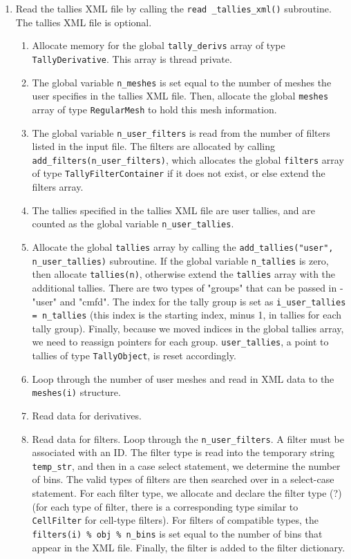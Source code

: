 \documentclass[10pt]{article}
\numberwithin{equation}{section} %
\begin{document}
\begin{enumerate}
\item Read the tallies XML file by calling the {\tt read \_tallies\_xml()} subroutine. The tallies XML file is optional. 
	\begin{enumerate}
	\item Allocate memory for the global {\tt tally\_derivs} array of type {\tt TallyDerivative}. This array is thread private. 
	\item The global variable {\tt n\_meshes} is set equal to the number of meshes the user specifies in the tallies XML file. Then, allocate the global {\tt meshes} array of type {\tt RegularMesh} to hold this mesh information. 
	\item The global variable {\tt n\_user\_filters} is read from the number of filters listed in the input file. The filters are allocated by calling {\tt add\_filters(n\_user\_filters)}, which allocates the global {\tt filters} array of type {\tt TallyFilterContainer} if it does not exist, or else extend the filters array. 
	\item The tallies specified in the tallies XML file are user tallies, and are counted as the global variable {\tt n\_user\_tallies}. 
	\item Allocate the global {\tt tallies} array by calling the {\tt add\_tallies("user", n\_user\_tallies)} subroutine. If the global variable {\tt n\_tallies} is zero, then allocate {\tt tallies(n)}, otherwise extend the {\tt tallies} array with the additional tallies. There are two types of "groups" that can be passed in - "user" and "cmfd". The index for the tally group is set as {\tt i\_user\_tallies = n\_tallies} (this index is the starting index, minus 1, in tallies for each tally group). Finally, because we moved indices in the global tallies array, we need to reassign pointers for each group. {\tt user\_tallies}, a point to tallies of type {\tt TallyObject}, is reset accordingly.
	\item Loop through the number of user meshes and read in XML data to the {\tt meshes(i)} structure. 
	\item Read data for derivatives. 
	\item Read data for filters. Loop through the {\tt n\_user\_filters}. A filter must be associated with an ID. The filter type is read into the temporary string {\tt temp\_str}, and then in a case select statement, we determine the number of bins. The valid types of filters are then searched over in a select-case statement. For each filter type, we allocate and declare the filter type (?) (for each type of filter, there is a corresponding type similar to {\tt CellFilter} for cell-type filters). For filters of compatible types, the {\tt filters(i) \% obj \% n\_bins} is set equal to the number of bins that appear in the XML file. Finally, the filter is added to the filter dictionary.

\end{enumerate}
\end{enumerate}
\end{document}
